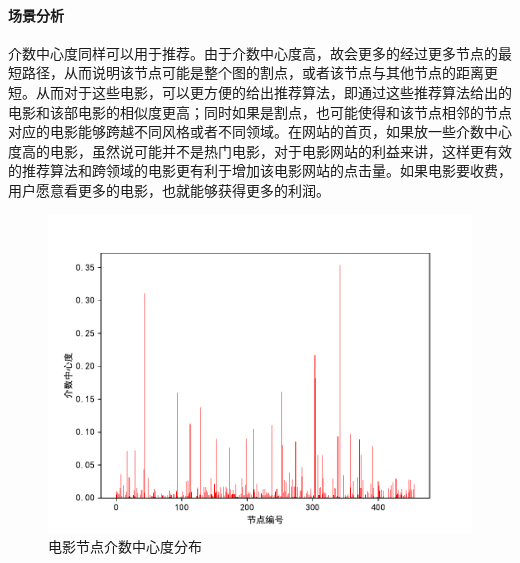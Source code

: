 \documentclass[UTF8, onecolumn, a4paper]{article}
\begin{document}
    \paragraph{场景分析}介数中心度同样可以用于推荐。由于介数中心度高，故会更多的经过更多节点的最短路径，从而说明该节点可能是整个图的割点，或者该节点与其他节点的距离更短。从而对于这些电影，可以更方便的给出推荐算法，即通过这些推荐算法给出的电影和该部电影的相似度更高；同时如果是割点，也可能使得和该节点相邻的节点对应的电影能够跨越不同风格或者不同领域。在网站的首页，如果放一些介数中心度高的电影，虽然说可能并不是热门电影，对于电影网站的利益来讲，这样更有效的推荐算法和跨领域的电影更有利于增加该电影网站的点击量。如果电影要收费，用户愿意看更多的电影，也就能够获得更多的利润。
\begin{center}
	\begin{figure}[ht] %
		\centering %
		\begin{minipage}[b]{0.95\linewidth} %
			\begin{minipage}[b]{0.47\linewidth} %
				\centering
				\includegraphics[width=\linewidth]{../pictures/movie_betweeness}
				\caption{电影节点介数中心度分布}
			\end{minipage}
			\hfill
			\begin{minipage}[b]{0.46\linewidth}
				\centering

\end{minipage}
\end{minipage}
\end{figure}
\end{center}
\end{document}
